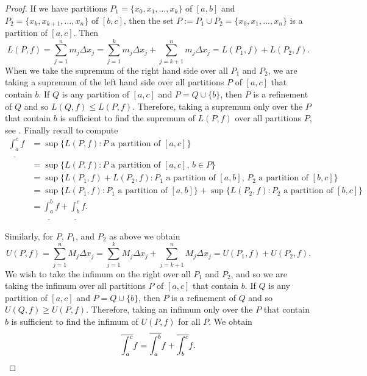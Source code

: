 \documentclass[12pt]{book}
\begin{document}
\begin{proof}
If we have partitions $P_1 = \{ x_0,x_1,\ldots,x_k \}$
of $[a,b]$ and $P_2 = \{ x_k, x_{k+1}, \ldots, x_n \}$ of $[b,c]$,
then the set $P := P_1 \cup P_2 = \{ x_0, x_1, \ldots, x_n \}$ is
a partition of $[a,c]$.
Then
\begin{equation*}
L(P,f) =
\sum_{j=1}^n m_j \Delta x_j
=
\sum_{j=1}^k m_j \Delta x_j
+
\sum_{j=k+1}^n m_j \Delta x_j
=
L(P_1,f) + L(P_2,f) .
\end{equation*}
When we take the supremum of the right hand side over all $P_1$ and $P_2$,
we are taking a supremum of the left hand side
over all partitions $P$ of $[a,c]$ that contain $b$.
If $Q$ is any partition
of $[a,c]$ and $P = Q \cup \{ b \}$, then $P$ is a refinement of $Q$
and so $L(Q,f) \leq L(P,f)$.
Therefore, taking a supremum only over the $P$
that contain $b$ is sufficient to find the supremum of $L(P,f)$
over all partitions $P$, see .
Finally recall 
to compute
\begin{equation*}
\begin{split}
\underline{\int_a^c} f
& =
\sup \{ L(P,f) : \text{$P$ a partition of $[a,c]$} \}
\\
& =
\sup \{ L(P,f) : \text{$P$ a partition of $[a,c]$, $b \in P$} \}
\\
& =
\sup \{ L(P_1,f) + L(P_2,f) :
\text{$P_1$ a partition of $[a,b]$, $P_2$ a partition of $[b,c]$} \}
\\
& =
\sup \{ L(P_1,f) : \text{$P_1$ a partition of $[a,b]$} \}
+
\sup \{ L(P_2,f) : \text{$P_2$ a partition of $[b,c]$} \}
\\
&=
\underline{\int_a^b} f + \underline{\int_b^c} f .
\end{split}
\end{equation*}

Similarly, for $P$, $P_1$, and $P_2$ as above we obtain
\begin{equation*}
U(P,f) =
\sum_{j=1}^n M_j \Delta x_j
=
\sum_{j=1}^k M_j \Delta x_j
+
\sum_{j=k+1}^n M_j \Delta x_j
=
U(P_1,f) + U(P_2,f) .
\end{equation*}
We wish to take the infimum on the right
over all $P_1$ and $P_2$, and so we are taking the infimum
over all partitions $P$ of $[a,c]$ that contain $b$.
If $Q$ is any partition
of $[a,c]$ and $P = Q \cup \{ b \}$, then $P$ is a refinement of $Q$
and so $U(Q,f) \geq U(P,f)$.
Therefore, taking an infimum only over the $P$
that contain $b$ is sufficient to find the infimum of $U(P,f)$ for
all $P$.
We obtain
\begin{equation*}
\overline{\int_a^c} f
=
\overline{\int_a^b} f + \overline{\int_b^c} f .  \qedhere
\end{equation*}
\end{proof}
\end{document}
